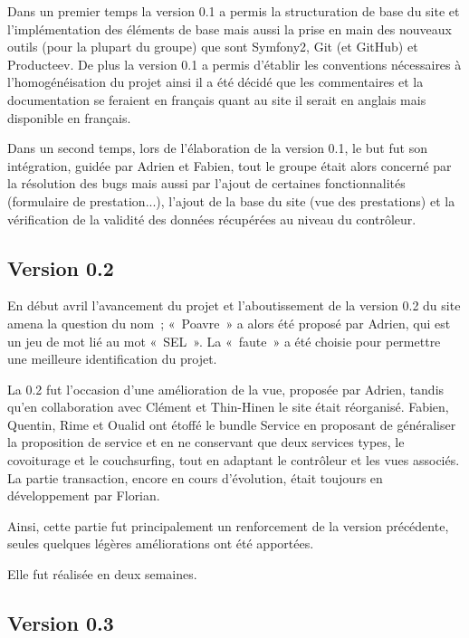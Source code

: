 Dans un premier temps la version 0.1 a permis la structuration de base du site et l'implémentation des éléments de base mais aussi la prise en main des nouveaux outils (pour la plupart du groupe) que sont Symfony2, Git (et GitHub) et Producteev. De plus la version 0.1 a permis d'établir les conventions nécessaires à l'homogénéisation du projet ainsi il a été décidé que les commentaires et la documentation se feraient en français quant au site il serait en anglais mais disponible en français.

Dans un second temps, lors de l'élaboration de la version 0.1, le but fut son intégration, guidée par Adrien et Fabien, tout le groupe était alors concerné par la résolution des bugs mais aussi par l'ajout de certaines fonctionnalités (formulaire de prestation...), l'ajout de la base du site (vue des prestations) et la vérification de la validité des données récupérées au niveau du contrôleur.

\subsection{Version 0.2}

En début avril l'avancement du projet et l'aboutissement de la version 0.2 du site amena la question du nom~; «~Poavre~» a alors été proposé par Adrien, qui est un jeu de mot lié au mot «~SEL~». La «~faute~» a été choisie pour permettre une meilleure identification du projet.

La 0.2 fut l'occasion d'une amélioration de la vue, proposée par Adrien, tandis qu'en collaboration avec Clément et Thin-Hinen le site était réorganisé. Fabien, Quentin, Rime et Oualid ont étoffé le bundle Service en proposant de généraliser la proposition de service et en ne conservant que deux services types, le covoiturage et le couchsurfing, tout en adaptant le contrôleur et les vues associés.
La partie transaction, encore en cours d'évolution, était toujours en développement par Florian.

Ainsi, cette partie fut principalement un renforcement de la version précédente, seules quelques légères améliorations ont été apportées.

Elle fut réalisée en deux semaines.

\subsection{Version 0.3}

